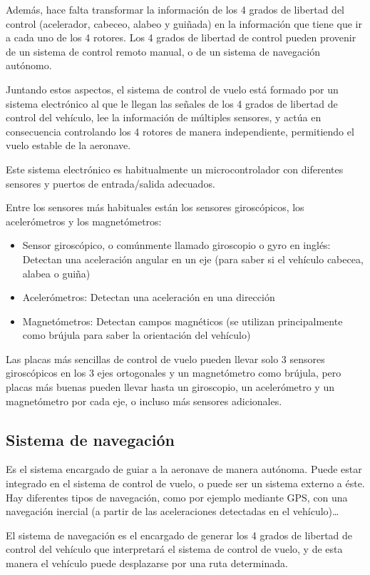 \documentclass[12pt,twoside]{article}
\begin{document}
Además, hace falta transformar la información de los 4 grados de libertad del control (acelerador, cabeceo, alabeo y guiñada) en la información que tiene que ir a cada uno de los 4 rotores. Los 4 grados de libertad de control pueden provenir de un sistema de control remoto manual, o de un sistema de navegación autónomo.

Juntando estos aspectos, el sistema de control de vuelo está formado por un sistema electrónico al que le llegan las señales de los 4 grados de libertad de control del vehículo, lee la información de múltiples sensores,  y actúa en consecuencia controlando los 4 rotores de manera independiente, permitiendo el vuelo estable de la aeronave.

Este sistema electrónico es habitualmente un microcontrolador con diferentes sensores y puertos de entrada/salida adecuados.

Entre los sensores más habituales están los sensores giroscópicos, los acelerómetros y los magnetómetros:
		\begin{itemize}
			\item Sensor giroscópico, o comúnmente llamado giroscopio o gyro en inglés: Detectan una aceleración angular en un eje (para saber si el vehículo cabecea, alabea o guiña)
			\item Acelerómetros: Detectan una aceleración en una dirección
			\item Magnetómetros: Detectan campos magnéticos (se utilizan principalmente como brújula para saber la orientación del vehículo)
		\end{itemize}
		Las placas más sencillas de control de vuelo pueden llevar solo 3 sensores giroscópicos en los 3 ejes ortogonales y un magnetómetro como brújula, pero placas más buenas pueden llevar hasta un giroscopio, un acelerómetro y un magnetómetro por cada eje, o incluso más sensores adicionales.

		\subsection{Sistema de navegación}\label{subsec:navegacion}

			Es el sistema encargado de guiar a la aeronave de manera autónoma. Puede estar integrado en el sistema de control de vuelo, o puede ser un sistema externo a éste. Hay diferentes tipos de navegación, como por ejemplo mediante GPS, con una navegación inercial (a partir de las aceleraciones detectadas en el vehículo)…

El sistema de navegación es el encargado de generar los 4 grados de libertad de control del vehículo que interpretará el sistema de control de vuelo, y de esta manera el vehículo puede desplazarse por una ruta determinada.
\end{document}
